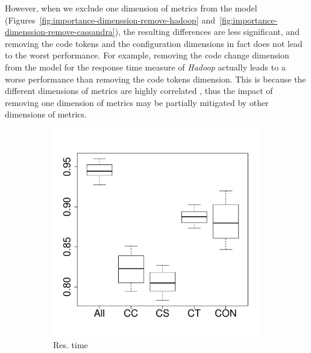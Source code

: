 However, when we exclude one dimension of metrics from the model (Figures~\ref{fig:importance-dimenssion-remove-hadoop} and~\ref{fig:importance-dimenssion-remove-cassandra}), the resulting differences %
are less significant, and removing the code tokens and the configuration dimensions in fact does not lead to the worst performance.
For example, removing the code change dimension from the model for the response time measure of \emph{Hadoop} actually leads to a worse performance than removing the code tokens dimension. 
This is because the different dimensions of metrics are highly correlated , thus the impact of removing one dimension of metrics may be partially mitigated by other dimensions of metrics.

\begin{figure}[t]
	\centering
        \begin{subfigure}{0.19\textwidth}
                \includegraphics[width=\linewidth]{Figures/runtime-hadoopkeep-importance.pdf}
                \caption{Res. time}
        \end{subfigure}%
        \begin{subfigure}{0.19\textwidth}

\end{subfigure}
\end{figure}
